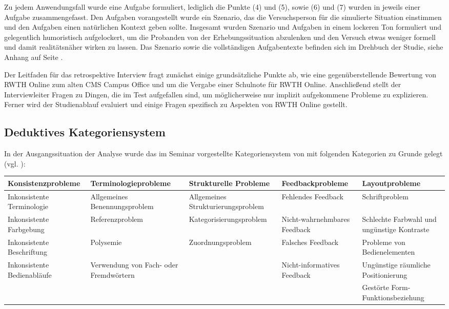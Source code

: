 Zu jedem Anwendungsfall wurde eine Aufgabe formuliert, lediglich die Punkte (4) und (5), sowie (6) und (7) wurden in jeweils einer Aufgabe zusammengefasst. Den Aufgaben vorangestellt wurde ein Szenario, das die Versuchsperson für die simulierte Situation einstimmen und den Aufgaben einen natürlichen Kontext geben sollte. Insgesamt wurden Szenario und Aufgaben in einem lockeren Ton formuliert und gelegentlich humoristisch aufgelockert, um die Probanden von der Erhebungssituation abzulenken und den Versuch etwas weniger formell und damit realitätsnäher wirken zu lassen. Das Szenario sowie die vollständigen Aufgabentexte befinden sich im Drehbuch der Studie, siehe Anhang auf Seite \pageref{att:Drehbuch}.

Der Leitfaden für das retrospektive Interview fragt zunächst einige grundsätzliche Punkte ab, wie eine gegenüberstellende Bewertung von RWTH Online zum alten CMS Campus Office und um die Vergabe einer Schulnote für RWTH Online. Anschließend stellt der Interviewleiter Fragen zu Dingen, die im Test aufgefallen sind, um möglicherweise nur implizit aufgekommene Probleme zu explizieren. Ferner wird der Studienablauf evaluiert und einige Fragen spezifisch zu Aspekten von RWTH Online gestellt.

\subsection*{Deduktives Kategoriensystem}
In der Ausgangssituation der Analyse wurde das im Seminar vorgestellte Kategoriensystem von \citeauthor{wirtz2009age} mit folgenden Kategorien zu Grunde gelegt (vgl. \cite{wirtz2009age}):

\begin{table}[h]
\def\arraystretch{1.1}
\begin{tabularx}{\textwidth}{|X|X|X|X|X|}
\hline
\textbf{Konsistenz\-probleme} & \textbf{Terminologie\-probleme} & \textbf{Strukturelle Probleme}       & \textbf{Feedback\-probleme} & \textbf{Layout\-probleme}\\ 
\hline
Inkonsistente Terminologie & Allgemeines Benennungsproblem & Allgemeines Strukturierungsproblem &      Fehlendes Feedback & Schriftproblem \\ 
\hline
Inkonsistente Farbgebung & Referenz\-problem & Kategori\-sierungs\-problem & Nicht-wahrnehmbares       Feedback & Schlechte Farbwahl und ungünstige Kontraste \\ 
\hline
Inkonsistente Beschriftung & Polysemie & Zuordnungs\-problem & Falsches Feedback & Probleme von        Bedienelementen \\ 
\hline
Inkonsistente Bedienabläufe & Verwendung von Fach- oder Fremdwörtern &  & Nicht-informatives           Feedback & Ungünstige räumliche Positionierung \\ 
\hline
& & & & Gestörte Form-Funktions\-beziehung \\ 
\hline
\end{tabularx}
\end{table}

